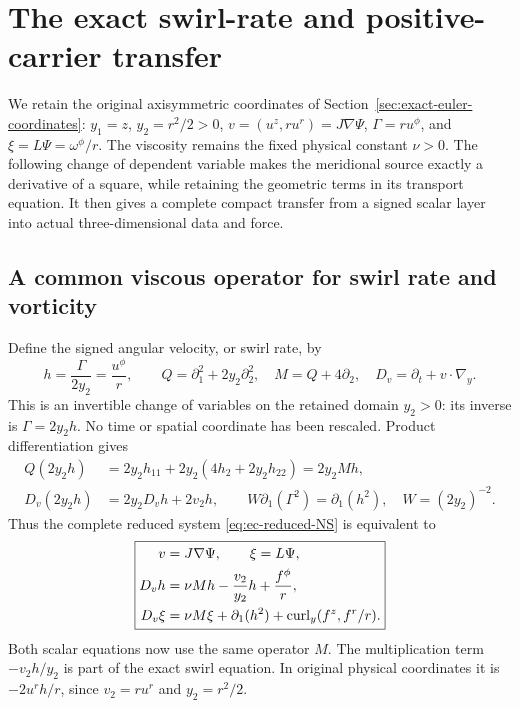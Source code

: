 \section{The exact swirl-rate and positive-carrier transfer}
\label{sec:swirl-carrier}

We retain the original axisymmetric coordinates of
Section~\ref{sec:exact-euler-coordinates}:
$y_1=z$, $y_2=r^2/2>0$, $v=(u^z,ru^r)=J\nabla\Psi$,
$\Gamma=ru^\phi$, and $\xi=L\Psi=\omega^\phi/r$.
The viscosity remains the fixed physical constant $\nu>0$.
The following change of dependent variable makes the meridional source
exactly a derivative of a square, while retaining the geometric terms
in its transport equation. It then gives a complete compact transfer
from a signed scalar layer into actual three-dimensional data and force.

\subsection{A common viscous operator for swirl rate and vorticity}

Define the signed angular velocity, or swirl rate, by
\[
 h=\frac{\Gamma}{2y_2}=\frac{u^\phi}{r},\qquad
 Q=\partial_1^2+2y_2\partial_2^2,\quad
 M=Q+4\partial_2,\quad D_v=\partial_t+v\cdot\nabla_y.
\]
This is an invertible change of variables on the retained domain
$y_2>0$: its inverse is $\Gamma=2y_2h$. No time or spatial coordinate
has been rescaled. Product differentiation gives
\begin{align}
 Q(2y_2h)&=2y_2h_{11}+2y_2(4h_2+2y_2h_{22})=2y_2Mh,
 \label{eq:sc-diffusion}\\
 D_v(2y_2h)&=2y_2D_vh+2v_2h,\qquad
 W\partial_1(\Gamma^2)=\partial_1(h^2),
 \quad W=(2y_2)^{-2}.
 \label{eq:sc-transport}
\end{align}
Thus the complete reduced system \eqref{eq:ec-reduced-NS} is
equivalent to
\begin{equation}\label{eq:sc-rate-system}
 \boxed{\begin{aligned}
 v&=J\nabla\Psi,\qquad \xi=L\Psi,\\
 D_vh&=\nu Mh-\frac{v_2}{y_2}h+\frac{f^\phi}{r},\\
 D_v\xi&=\nu M\xi+\partial_1(h^2)
                    +\operatorname{curl}_y(f^z,f^r/r).
 \end{aligned}}
\end{equation}
Both scalar equations now use the same operator $M$. The multiplication
term $-v_2h/y_2$ is part of the exact swirl equation. In original physical
coordinates it is $-2u^rh/r$, since $v_2=ru^r$ and $y_2=r^2/2$.

